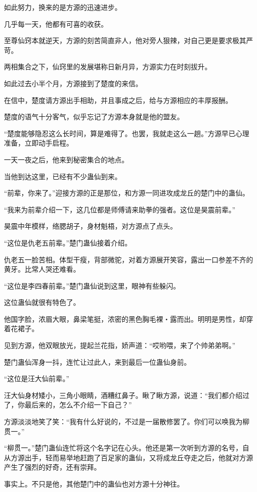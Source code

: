 \begin{this_body}
如此努力，换来的是方源的迅速进步。

几乎每一天，他都有可喜的收获。

至尊仙窍本就逆天，方源的刻苦简直非人，他对旁人狠辣，对自己更是要求极其严苛。

两相集合之下，仙窍里的发展堪称日新月异，方源实力在时刻拔升。

如此过去小半个月，方源接到了楚度的来信。

在信中，楚度请方源出手相助，并且事成之后，给与方源相应的丰厚报酬。

楚度的语气十分客气，似乎忘记了方源本身就是他的盟友。

“楚度能够隐忍这么长时间，算是难得了。也罢，我就走这么一趟。”方源早已心理准备，立即动手启程。

一天一夜之后，他来到秘密集合的地点。

当他到达这里，已经有不少蛊仙到来。

“前辈，你来了。”迎接方源的正是那位，和方源一同进攻成龙丘的楚门中的蛊仙。

“我来为前辈介绍一下，这几位都是师傅请来助拳的强者。这位是昊震前辈。”

昊震中年模样，络腮胡子，身材魁梧，对方源点了点头。

“这位是仇老五前辈。”楚门蛊仙接着介绍。

仇老五一脸苦相。体型干瘦，背部微驼，对着方源展开笑容，露出一口参差不齐的黄牙。比常人哭还难看。

“这位是李四春前辈。”楚门蛊仙说到这里，眼神有些躲闪。

这位蛊仙就很有特色了。

他国字脸，浓眉大眼，鼻梁笔挺，浓密的黑色胸毛裸・露而出。明明是男性，却穿着花裙子。

见到方源，他双眼放光，提起兰花指，娇声道：“哎哟喂，来了个帅弟弟啊。”

楚门蛊仙浑身一抖，连忙让过此人，来到最后一位蛊仙身前。

“这位是汪大仙前辈。”

汪大仙身材矮小，三角小眼睛，酒糟红鼻子。瞅了瞅方源，说道：“我们都介绍过了，你最后来的，怎么不介绍一下自己？”

方源淡淡地笑了笑：“我有什么好说的，不过是一届散修罢了。你们可以唤我为柳贯一。”

“柳贯一。”楚门蛊仙连忙将这个名字记在心头。他还是第一次听到方源的名号，自从方源出手，轻而易举地赶跑了百足家的蛊仙，又将成龙丘夺走之后，他就对方源产生了强烈的好奇，还有崇拜。

事实上。不只是他，其他楚门中的蛊仙也对方源十分神往。


\end{this_body}
